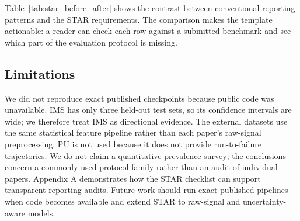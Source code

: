 \documentclass[pdflatex,sn-mathphys-num]{sn-jnl}
\begin{document}
Table~\ref{tab:star_before_after} shows the contrast between conventional reporting patterns and the STAR requirements. The comparison makes the template actionable: a reader can check each row against a submitted benchmark and see which part of the evaluation protocol is missing.

\begin{table}[t]
\centering
\caption{Conventional reporting patterns versus STAR requirements.}
\label{tab:star_before_after}
\small
{}
\end{table}

\subsection{Limitations}
We did not reproduce exact published checkpoints because public code was unavailable. IMS has only three held-out test sets, so its confidence intervals are wide; we therefore treat IMS as directional evidence. The external datasets use the same statistical feature pipeline rather than each paper's raw-signal preprocessing. PU is not used because it does not provide run-to-failure trajectories. We do not claim a quantitative prevalence survey; the conclusions concern a commonly used protocol family rather than an audit of individual papers. Appendix A demonstrates how the STAR checklist can support transparent reporting audits. Future work should run exact published pipelines when code becomes available and extend STAR to raw-signal and uncertainty-aware models.
\end{document}

